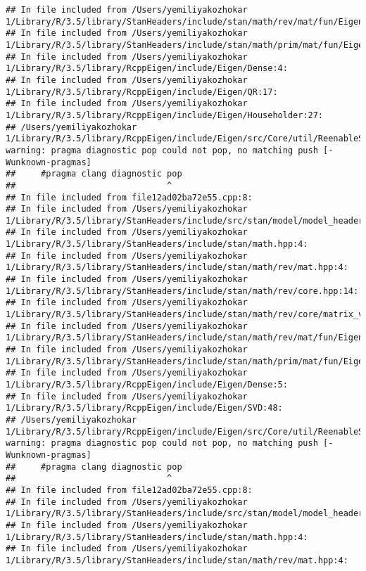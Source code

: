 \documentclass[]{article}
\begin{document}
\begin{verbatim}
## In file included from /Users/yemiliyakozhokar 1/Library/R/3.5/library/StanHeaders/include/stan/math/rev/mat/fun/Eigen_NumTraits.hpp:4:
## In file included from /Users/yemiliyakozhokar 1/Library/R/3.5/library/StanHeaders/include/stan/math/prim/mat/fun/Eigen.hpp:4:
## In file included from /Users/yemiliyakozhokar 1/Library/R/3.5/library/RcppEigen/include/Eigen/Dense:4:
## In file included from /Users/yemiliyakozhokar 1/Library/R/3.5/library/RcppEigen/include/Eigen/QR:17:
## In file included from /Users/yemiliyakozhokar 1/Library/R/3.5/library/RcppEigen/include/Eigen/Householder:27:
## /Users/yemiliyakozhokar 1/Library/R/3.5/library/RcppEigen/include/Eigen/src/Core/util/ReenableStupidWarnings.h:10:30: warning: pragma diagnostic pop could not pop, no matching push [-Wunknown-pragmas]
##     #pragma clang diagnostic pop
##                              ^
## In file included from file12ad02ba72e55.cpp:8:
## In file included from /Users/yemiliyakozhokar 1/Library/R/3.5/library/StanHeaders/include/src/stan/model/model_header.hpp:4:
## In file included from /Users/yemiliyakozhokar 1/Library/R/3.5/library/StanHeaders/include/stan/math.hpp:4:
## In file included from /Users/yemiliyakozhokar 1/Library/R/3.5/library/StanHeaders/include/stan/math/rev/mat.hpp:4:
## In file included from /Users/yemiliyakozhokar 1/Library/R/3.5/library/StanHeaders/include/stan/math/rev/core.hpp:14:
## In file included from /Users/yemiliyakozhokar 1/Library/R/3.5/library/StanHeaders/include/stan/math/rev/core/matrix_vari.hpp:4:
## In file included from /Users/yemiliyakozhokar 1/Library/R/3.5/library/StanHeaders/include/stan/math/rev/mat/fun/Eigen_NumTraits.hpp:4:
## In file included from /Users/yemiliyakozhokar 1/Library/R/3.5/library/StanHeaders/include/stan/math/prim/mat/fun/Eigen.hpp:4:
## In file included from /Users/yemiliyakozhokar 1/Library/R/3.5/library/RcppEigen/include/Eigen/Dense:5:
## In file included from /Users/yemiliyakozhokar 1/Library/R/3.5/library/RcppEigen/include/Eigen/SVD:48:
## /Users/yemiliyakozhokar 1/Library/R/3.5/library/RcppEigen/include/Eigen/src/Core/util/ReenableStupidWarnings.h:10:30: warning: pragma diagnostic pop could not pop, no matching push [-Wunknown-pragmas]
##     #pragma clang diagnostic pop
##                              ^
## In file included from file12ad02ba72e55.cpp:8:
## In file included from /Users/yemiliyakozhokar 1/Library/R/3.5/library/StanHeaders/include/src/stan/model/model_header.hpp:4:
## In file included from /Users/yemiliyakozhokar 1/Library/R/3.5/library/StanHeaders/include/stan/math.hpp:4:
## In file included from /Users/yemiliyakozhokar 1/Library/R/3.5/library/StanHeaders/include/stan/math/rev/mat.hpp:4:

\end{verbatim}
\end{document}
